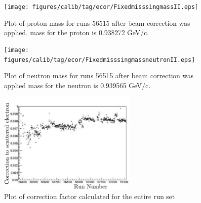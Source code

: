 \begin{figure}\begin{center}
\texttt{[image: figures/calib/tag/ecor/FixedmisssingmassII.eps]}
\caption[Proton Mass for Run 56515 After Beam Correction]{\label{fig:proton.fix} Plot of proton mass for runs 56515 after beam correction was applied.   mass for the proton is 0.938272 GeV/c.}
\end{center}\end{figure}

\begin{figure}\begin{center}
\texttt{[image: figures/calib/tag/ecor/FixedmisssingmassneutronII.eps]}
\caption[Neutron Mass for Run 56515 After Beam Correction]{\label{fig:neutron.fix} Plot of neutron mass for runs 56515 after beam correction was applied   mass for the neutron is 0.939565 GeV/c.}
\end{center}\end{figure}

\begin{figure}\begin{center}
\includegraphics[width=0.6\textwidth]{figures/calib/tag/ecor/beam_cor.eps}
\caption[Beam Correction Factors for Entire  Runs]{\label{fig:beamcor.run} Plot of correction factor calculated for the entire  run set}
\end{center}\end{figure}

